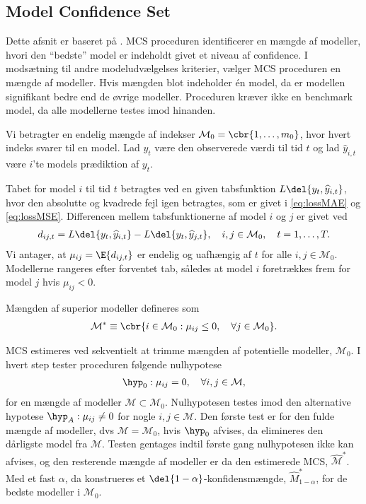 \subsection{Model Confidence Set}
Dette afsnit er baseret på \citep{mcs2011}. 
MCS proceduren identificerer en mængde af modeller, hvori den ``bedste'' model er indeholdt givet et niveau af confidence.
I modsætning til andre modeludvælgelses kriterier, vælger MCS proceduren en mængde af modeller.
Hvis mængden blot indeholder én model, da er modellen signifikant bedre end de øvrige modeller.
Proceduren kræver ikke en benchmark model, da alle modellerne testes imod hinanden.

Vi betragter en endelig mængde af indekser \(\mathcal{M}_0 = \cbr{1, \ldots, m_0}\), hvor hvert indeks svarer til en model.
Lad \(y_t\) være den observerede værdi til tid \(t\) og lad \(\widehat{y}_{i,t}\) være \(i\)'te models prædiktion af \(y_t\).  

Tabet for model \(i\) til tid \(t\) betragtes ved en given tabsfunktion \(L \del{y_t, \widehat{y}_{i,t}}\), hvor den absolutte og kvadrede fejl igen betragtes, som er givet i \eqref{eq:lossMAE} og \eqref{eq:lossMSE}.
Differencen mellem tabsfunktionerne af model \(i\) og \(j\) er givet ved
\begin{align*}
d_{ij,t} = L \del{y_t, \widehat{y}_{i,t}} - L \del{y_t, \widehat{y}_{j,t}}, \quad i, j \in \mathcal{M}_0, \quad t = 1, \ldots, T.
\end{align*}
Vi antager, at \(\mu_{ij} = \E{d_{ij,t}}\) er endelig og uafhængig af \(t\) for alle \( i, j \in \mathcal{M}_0\).
Modellerne rangeres efter forventet tab, således at model \(i\) foretrækkes frem for model \(j\) hvis \(\mu_{ij} < 0\).
%
\begin{defn}
Mængden af superior modeller defineres som
\begin{align*}
\mathcal{M}^* \equiv \cbr{i \in \mathcal{M}_0 : \mu_{ij} \leq 0, \quad \forall j \in \mathcal{M}_0}. 
\end{align*}
\end{defn}
%
MCS estimeres ved sekventielt at trimme mængden af potentielle modeller, \(\mathcal{M}_0\).
I hvert step tester proceduren følgende nulhypotese
\begin{align*}
\hyp_0: \mu_{ij} = 0, \quad \forall i,j \in \mathcal{M},
\end{align*}
for en mængde af modeller \(\mathcal{M} \subset \mathcal{M}_0\).
Nulhypotesen testes imod den alternative hypotese \(\hyp_A: \mu_{ij} \neq 0\) for nogle \(i, j \in \mathcal{M}\).
Den første test er for den fulde mængde af modeller, dvs \(\mathcal{M} = \mathcal{M}_0\), hvis \(\hyp_0\) afvises, da elimineres den dårligste model fra \(\mathcal{M}\).
Testen gentages indtil første gang nulhypotesen ikke kan afvises, og den resterende mængde af modeller er da den estimerede MCS, \(\widehat{\mathcal{M}}^*\).
Med et fast \(\alpha\), da konstrueres et \(\del{1-\alpha}\)-konfidensmængde, \(\widehat{M}^*_{1-\alpha}\), for de bedste modeller i \(\mathcal{M}_0\).


